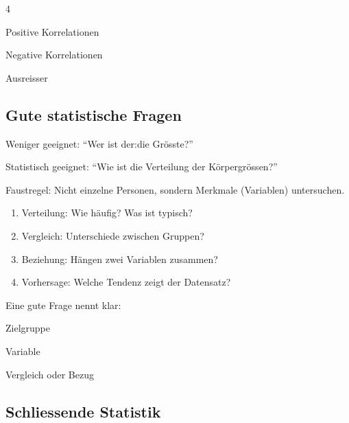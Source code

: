 \begin{landscape}
\begin{multicols*}{4}
\begin{cheatSheetBox}[title=Boxplot]
\end{cheatSheetBox}

\begin{cheatSheetBox}[title=Scatterplot]

\begin{itemize*}
\item Positive Korrelationen
\item Negative Korrelationen
\item Ausreisser
\end{itemize*}
\end{cheatSheetBox}

\textcolor{\cheatSheetColor}{\subsection*{Gute statistische Fragen}}

\begin{cheatSheetBox}[title=Von Thema zu Statistikfrage]
Weniger geeignet:
\enquote{Wer ist der:die Grösste?}

Statistisch geeignet:
\enquote{Wie ist die Verteilung der Körpergrössen?}

Faustregel:
Nicht einzelne Personen, sondern Merkmale (Variablen) untersuchen.
\end{cheatSheetBox}

\begin{cheatSheetBox}[title=Vier gute Fragetypen]
\begin{enumerate}
\item Verteilung: Wie häufig? Was ist typisch?
\item Vergleich: Unterschiede zwischen Gruppen?
\item Beziehung: Hängen zwei Variablen zusammen?
\item Vorhersage: Welche Tendenz zeigt der Datensatz?
\end{enumerate}
\end{cheatSheetBox}

\begin{cheatSheetBox}[title=Präzise formulieren]
Eine gute Frage nennt klar:
\begin{enumerate*}
\item Zielgruppe
\item Variable
\item Vergleich oder Bezug
\end{enumerate*}
\end{cheatSheetBox}

\textcolor{\cheatSheetColor}{\subsection*{Schliessende Statistik}}


\end{multicols*}
\end{landscape}
